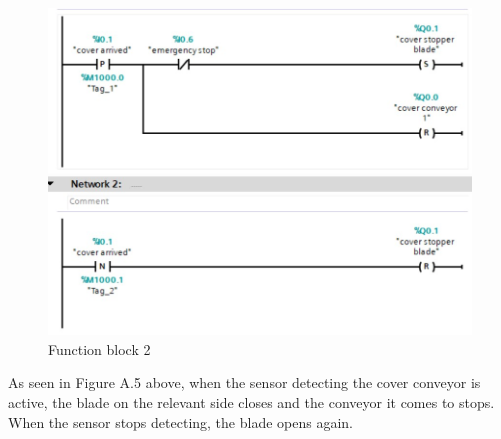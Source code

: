 \begin{figure}[H]
    \centering
    \includegraphics[width=0.60\columnwidth]{imgs/io/tia4.jpg}
    \caption[Function block 2]{Function block 2}
    \label{fig-magnitude}
\end{figure}%
As seen in Figure A.5 above, when the sensor detecting the cover conveyor is active, the blade on the relevant side closes and the conveyor it comes to stops. When the sensor stops detecting, the blade opens again.

